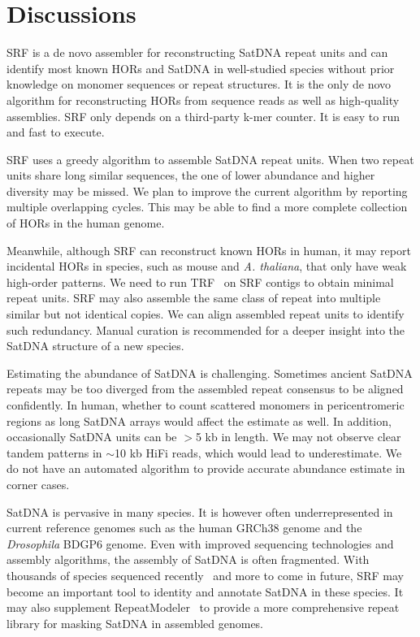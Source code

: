 \documentclass{bioinfo}
\begin{document}
\section{Discussions}

SRF is a de novo assembler for reconstructing SatDNA repeat units and can
identify most known HORs and SatDNA in well-studied species without prior
knowledge on monomer sequences or repeat structures. It is the only de novo
algorithm for reconstructing HORs from sequence reads as well as high-quality
assemblies. SRF only depends on a third-party k-mer counter. It is easy to run
and fast to execute.

SRF uses a greedy algorithm to assemble SatDNA repeat units. When two repeat
units share long similar sequences, the one of lower abundance and higher
diversity may be missed. We plan to improve the current algorithm by reporting
multiple overlapping cycles. This may be able to find a more complete
collection of HORs in the human genome.

Meanwhile, although SRF can reconstruct known HORs in human, it may report
incidental HORs in species, such as mouse and \emph{A. thaliana}, that only
have weak high-order patterns. We need to run TRF~\citep{Benson:1999aa} on SRF
contigs to obtain minimal repeat units. SRF may also assemble the same class of
repeat into multiple similar but not identical copies. We can align assembled
repeat units to identify such redundancy. Manual curation is recommended for a
deeper insight into the SatDNA structure of a new species.

Estimating the abundance of SatDNA is challenging. Sometimes ancient SatDNA
repeats may be too diverged from the assembled repeat consensus to be aligned
confidently. In human, whether to count scattered monomers in pericentromeric
regions as long SatDNA arrays would affect the estimate as well. In addition,
occasionally SatDNA units can be $>$5 kb in length. We may not observe clear
tandem patterns in $\sim$10 kb HiFi reads, which would lead to underestimate.
We do not have an automated algorithm to provide accurate abundance estimate in
corner cases.

SatDNA is pervasive in many species. It is however often underrepresented in
current reference genomes such as the human GRCh38 genome and the
\emph{Drosophila} BDGP6 genome. Even with improved sequencing technologies and
assembly algorithms, the assembly of SatDNA is often fragmented. With thousands
of species sequenced recently~\citep{Challis:2020aa,Rhie:2021ug} and more to
come in future, SRF may become an important tool to identity and annotate
SatDNA in these species. It may also supplement
RepeatModeler~\citep{Flynn:2020aa} to provide a more comprehensive repeat
library for masking SatDNA in assembled genomes.
\end{document}
